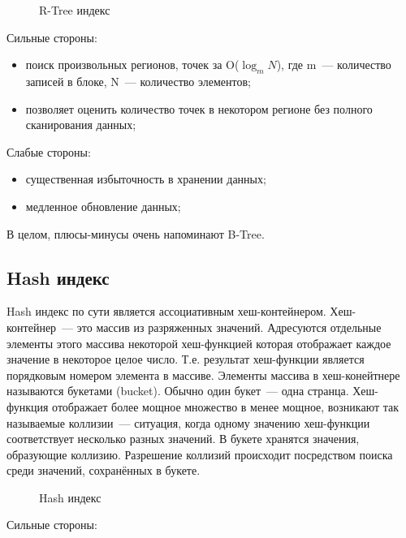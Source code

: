 \begin{figure}[ht!]
  \caption{R-Tree индекс}
  \label{fig:rtree_index}
\end{figure}

Сильные стороны:

\begin{itemize}
  \item поиск произвольных регионов, точек за O($\log_m{N}$), где m~--- количество записей в блоке, N~--- количество элементов;
  \item позволяет оценить количество точек в некотором регионе без полного сканирования данных;
\end{itemize}

Слабые стороны:

\begin{itemize}
  \item существенная избыточность в хранении данных;
  \item медленное обновление данных;
\end{itemize}

В целом, плюсы-минусы очень напоминают B-Tree.




\subsection{Hash индекс}

Hash индекс по сути является ассоциативным хеш-контейнером. Хеш-контейнер~--- это массив из разряженных значений. Адресуются отдельные элементы этого массива некоторой хеш-функцией которая отображает каждое значение в некоторое целое число. Т.е. результат хеш-функции является порядковым номером элемента в массиве. Элементы массива в хеш-конейтнере называются букетами (bucket). Обычно один букет~--- одна странца. Хеш-функция отображает более мощное множество в менее мощное, возникают так называемые коллизии~--- ситуация, когда одному значению хеш-функции соответствует несколько разных значений. В букете хранятся значения, образующие коллизию. Разрешение коллизий происходит посредством поиска среди значений, сохранённых в букете.

\begin{figure}[ht!]
  \caption{Hash индекс}
  \label{fig:hash_index}
\end{figure}

Сильные стороны:

